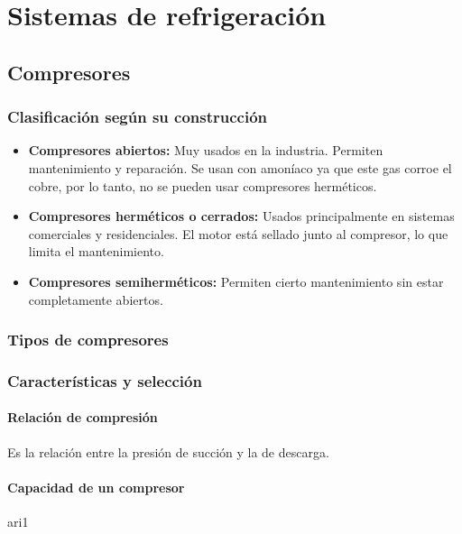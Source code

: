 \chapter{Sistemas de refrigeración}

\section{Compresores}

\subsection{Clasificación según su construcción}
\begin{itemize}
    \item \textbf{Compresores abiertos:} Muy usados en la industria. Permiten mantenimiento y reparación. Se usan con amoníaco ya que este gas corroe el cobre, por lo tanto, no se pueden usar compresores herméticos.
    
    \item \textbf{Compresores herméticos o cerrados:} Usados principalmente en sistemas comerciales y residenciales. El motor está sellado junto al compresor, lo que limita el mantenimiento.
    
    \item \textbf{Compresores semiherméticos:} Permiten cierto mantenimiento sin estar completamente abiertos.
\end{itemize}

\subsection{Tipos de compresores}

\subsection{Características y selección}

\subsubsection{Relación de compresión} Es la relación entre la presión de succión y la de descarga.

\subsubsection{Capacidad de un compresor}

\parencite{Pág. 200 R11-2.1}{ari1}


